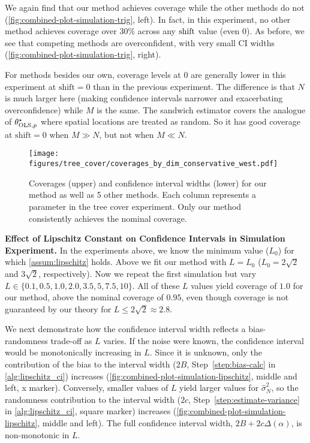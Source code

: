 We again find that our method achieves coverage while the other methods do not (\cref{fig:combined-plot-simulation-trig}, left). In fact, in this experiment, no other method achieves coverage over 30\% across any $\mathrm{shift}$ value (even 0).  As before, we see that competing methods are overconfident, with very small CI widths (\cref{fig:combined-plot-simulation-trig}, right). 

For methods besides our own, coverage levels at $0$ are generally lower in this experiment at $\mathrm{shift}=0$ than in the previous experiment. The difference is that $N$ is much larger here (making confidence intervals narrower and exacerbating overconfidence) while $M$ is the same. The sandwich estimator covers the analogue of $\theta^{\star}_{\text{OLS},p}$ where spatial locations are treated as random. So it has good coverage at $\mathrm{shift}=0$ when $M \gg N$, but not when $M \ll N$.

\begin{figure*}[!ht]
    \centering
    \texttt{[image: figures/tree\_cover/coverages\_by\_dim\_conservative\_west.pdf]}
    \caption{Coverages (upper) and confidence interval widths (lower) for our method as well as 5 other methods. Each column represents a parameter in the tree cover experiment. Only our method consistently achieves the nominal coverage.}
    \label{fig:tree-cover-coverage-main-west}
\end{figure*}

\textbf{Effect of Lipschitz Constant on Confidence Intervals in Simulation Experiment.}
In the experiments above, we know the minimum value ($L_0$) for which \cref{assum:lipschitz} holds. Above we fit our method with $L=L_0$ ($L_0=2\sqrt{2}$ and $3\sqrt{2}$, respectively). 
Now we repeat the first simulation but vary $L \in \{0.1, 0.5, 1.0, 2.0, 3.5, 5, 7.5, 10\}$. All of these $L$ values yield coverage of $1.0$ for our method, above the nominal coverage of $0.95$, even though coverage is not guaranteed by our theory for $L \leq 2 \sqrt{2} \approx 2.8$.

We next demonstrate how the confidence interval width reflects a bias-randomness trade-off as $L$ varies. If the noise were known, the confidence interval would be monotonically increasing in $L$. Since it is unknown, only the contribution of the bias to the interval width ($2B$, Step~\ref{step:bias-calc} in \cref{alg:lipschitz_ci}) increases (\cref{fig:combined-plot-simulation-lipschitz}, middle and left, x marker). Conversely, smaller values of $L$ yield larger values for $\hat{\sigma}^2_N$, so the randomness contribution to the interval width ($2c$, Step~\ref{step:estimate-variance} in \cref{alg:lipschitz_ci}, square marker) increases (\cref{fig:combined-plot-simulation-lipschitz}, middle and left). The full confidence interval width, $2B + 2c \Delta(\alpha)$, is non-monotonic in $L$.

